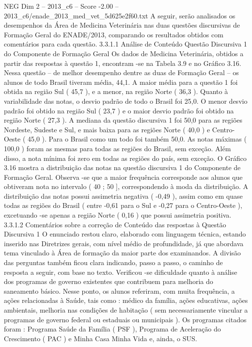 \begin{textsample}{NEG Dim 2 – 2013\_c6 – Score -2.00 – 2013\_c6/enade\_2013\_med\_vet\_5d625e2f60.txt}
A seguir, serão analisados os desempenhos da Área de Medicina Veterinária nas duas questões discursivas de Formação Geral do ENADE/2013, comparando os resultados obtidos com comentários para cada questão. 3.3.1.1 Análise de Conteúdo Questão Discursiva 1 do Componente de Formação Geral Os dados de Medicina Veterinária, obtidos a partir das respostas à questão 1, encontram -se na Tabela 3.9 e no Gráfico 3.16.
Nessa questão – de melhor desempenho dentre as duas de Formação Geral – os alunos de todo Brasil tiveram média, 44,1.
A maior média para a questão 1 foi obtida na região Sul ( 45,7 ), e a menor, na região Norte ( 36,3 ).
Quanto à variabilidade das notas, o desvio padrão de todo o Brasil foi 25,0.
O menor desvio padrão foi obtido na região Sul ( 23,7 ) e o maior desvio padrão foi obtido na região Norte ( 27,3 ).
A mediana da questão discursiva 1 foi 50,0 para as regiões Nordeste, Sudeste e Sul, e mais baixa para as regiões Norte ( 40,0 ) e Centro-Oeste ( 45,0 ).
Para o Brasil como um todo foi também 50,0.
As notas máximas ( 100,0 ) foram as mesmas para todas as regiões do Brasil, sem exceção.
Além disso, a nota mínima foi zero em todas as regiões do país, sem exceção.
O Gráfico 3.16 mostra a distribuição das notas na questão discursiva 1 do Componente de Formação Geral.
Observa -se que a maior frequência corresponde aos alunos que obtiveram nota no intervalo ( 40 ; 50 ], correspondendo à moda da distribuição.
A distribuição das notas possui assimetria negativa ( -0,49 ), assim como em quase todas as regiões do Brasil ( entre -0,61 para o Sul e -0,27 para o Centro-Oeste ), excetuando -se apenas a região Norte ( 0,16 ) que possui assimetria positiva. 3.3.1.2 Comentários sobre a correção de Conteúdo das respostas à Questão Discursiva 1 O enunciado restou claro, elaborado com linguagem técnica, estando inserido nas Diretrizes gerais, com nível médio de profundidade, já que abordava tema vinculado à Área de formação da maior parte dos examinandos.
A divisão das perguntas também ficou clara indicando, passo a passo, o caminho de resposta a seguir, com base no texto.
Verificou -se dificuldade quanto à análise dos programas de governo existentes que contribuem para melhoria do saneamento básico.
Nesse ponto, os alunos referiram, com muita frequência, a ações relacionadas à Saúde, tais como : médico da família, ações educativas, ações ambientais, melhoria nas condições de habitação ( sem necessariamente vincular a programas de governo federal ou estaduais ou municipais ).
Os programas citados foram : Programa Saúde da Família ( PSF ), Programa de Aceleração do Crescimento ( PAC ) e Minha Casa Minha Vida e, ainda, o SUS.

\end{textsample}
